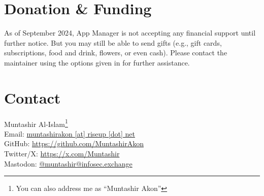 \section{Donation \& Funding}\label{sec:donation-&-funding} %
%
%
%
%

As of September 2024, App Manager is not accepting any financial support until further notice. But
you may still be able to send gifts (e.g., gift cards, subscriptions, food and drink, flowers, or
even cash). Please contact the maintainer using the options given in  for further
assistance.


\section{Contact}\label{sec:contact} %
Muntashir Al-Islam\footnote{You can also address me as ``Muntashir Akon''}\\
Email: \href{mailto:muntashirakon@riseup.net}{muntashirakon [at] riseup [dot] net}\\
GitHub: \url{https://github.com/MuntashirAkon}\\
Twitter/X: \url{https://x.com/Muntashir}\\
Mastodon: \href{https://infosec.exchange/@muntashir}{@muntashir@infosec.exchange}

